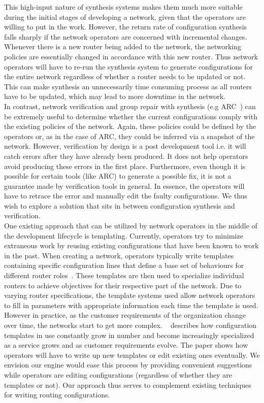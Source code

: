 This high-input nature of synthesis systems makes them much more suitable during the initial stages of developing a network, given that the operators are willing to put in the work. However, the return rate of configuration synthesis falls sharply if the network operators are concerned with incremental changes. Whenever there is a new router being added to the network, the networking policies are essentially changed in accordance with this new router. Thus network operators will have to re-run the synthesis system to generate configurations for the entire network regardless of whether a router needs to be updated or not. This can make synthesis an unnecessarily time consuming process as all routers have to be updated, which may lead to more downtime in the network.\\ 

In contrast, network verification and group repair with synthesis (e.g ARC~\cite{arc}) can be extremely useful to determine whether the current configurations comply with the existing policies of the network. Again, these policies could be defined by the operators or, as in the case of ARC, they could be inferred via a snapshot of the network. However, verification by design is a post development tool i.e. it will catch errors after they have already been produced. It does not help operators avoid producing these errors in the first place. Furthermore, even though it is possible for certain tools (like ARC) to generate a possible fix, it is not a guarantee made by verification tools in general. In essence, the operators will have to retrace the error and manually edit the faulty configurations. We thus wish to explore a solution that sits in between configuration synthesis and verification.\\

One existing approach that can be utilized by network operators in the middle of the development lifecycle is templating. Currently, operators try to minimize extraneous work by reusing existing configurations that have been known to work in the past. When creating a network, operators typically write templates containing specific configuration lines that define a base set of behaviours for different router roles~\cite{complexity}. These templates are then used to specialize individual routers to achieve objectives for their respective part of the network. Due to varying router specifications, the template systems used allow network operators to fill in parameters with appropriate information each time the template is used. However in practice, as the customer requirements of the organization change over time, the networks start to get more complex. ~\cite{Benson} describes how configuration templates in use constantly grow in number and become increasingly specialized as a service grows and as customer requirements evolve. The paper shows how operators will have to write up new templates or edit existing ones eventually. We envision our engine would ease this process by providing convenient suggestions while operators are editing configurations (regardless of whether they are templates or not).
Our approach thus serves to complement existing techniques for writing routing configurations.\\ 

